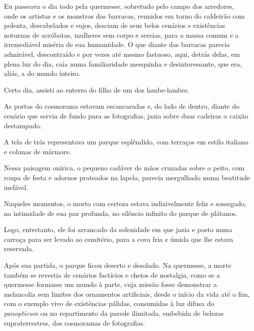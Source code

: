 
Eu passeava o dia todo pela quermesse, sobretudo pelo campo dos arredores,
onde os artistas e os monstros das barracas, reunidos em torno do caldeirão
com polenta, descabelados e sujos, desciam de seus belos cenários e
existências noturnas de acróbatas, mulheres sem corpo e sereias, para a massa
comum e a irremediável miséria de sua humanidade. O que diante das barracas
parecia admirável, descontraído e por vezes até mesmo fastuoso, aqui, detrás
delas, em plena luz do dia, caía numa familiaridade mesquinha e
desinteressante, que era, aliás, a do mundo inteiro.

Certo dia, assisti ao enterro do filho de um dos lambe-lambes.

As portas do cosmorama estavam escancaradas e, do lado de dentro, diante do
cenário que servia de fundo para as fotografias, jazia sobre duas cadeiras o
caixão destampado.

A tela de trás representava um parque esplêndido, com terraços em estilo
italiano e colunas de mármore.

Nessa paisagem onírica, o pequeno cadáver de mãos cruzadas sobre o peito, com
roupa de festa e adornos prateados na lapela, parecia mergulhado numa
beatitude inefável.


Naqueles momentos, o morto com certeza estava indizivelmente feliz e
sossegado, na intimidade de sua paz profunda, no silêncio infinito do parque
de plátanos.

Logo, entretanto, ele foi arrancado da solenidade em que jazia e posto numa
carroça para ser levado ao cemitério, para a cova fria e úmida que lhe estava
reservada.

Após sua partida, o parque ficou deserto e desolado. Na quermesse, a morte
também se revestia de cenários factícios e cheios de nostalgia, como se a
quermesse formasse um mundo à parte, cuja missão fosse demonstrar a
melancolia sem limites dos ornamentos artificiais, desde o início da vida até
o fim, com o exemplo vivo de existências pálidas, consumidas à luz difusa
do \textit{panopticum} ou no repartimento da parede ilimitada, embebida de
belezas supraterrestres, dos cosmoramas de fotografias. 


